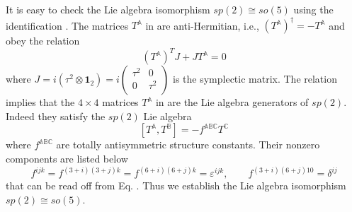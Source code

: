 \documentclass[12pt,epsf]{article}
\begin{document}
It is easy to check the Lie algebra isomorphism $sp(2) \cong so(5)$ using the identification .
The matrices $T^\mathbb{A}$ in  are anti-Hermitian, i.e.,
$(T^\mathbb{A})^\dagger = - T^\mathbb{A}$ and obey the relation
\begin{equation}\label{sp2-cond}
 (T^\mathbb{A})^T J + J T^\mathbb{A} = 0
\end{equation}
where $J = i (\tau^2 \otimes \mathbf{1}_2) = i \left(
                                   \begin{array}{cc}
                                     \tau^2 & 0 \\
                                     0 & \tau^2 \\
                                   \end{array}
                                 \right)$ is the symplectic matrix.
The relation  implies that the $4 \times 4$ matrices $T^\mathbb{A}$ in  are the Lie algebra generators
of $sp(2)$. Indeed they satisfy the $sp(2)$ Lie algebra
\begin{equation}\label{sp2-lie}
  [T^\mathbb{A}, T^\mathbb{B}] = -f^{\mathbb{A} \mathbb{B} \mathbb{C}} T^\mathbb{C}
\end{equation}
where $f^{\mathbb{A}\mathbb{B}\mathbb{C}}$ are totally antisymmetric structure constants.
Their nonzero components are listed below
\begin{equation}\label{sp2-str-const}
  f^{ijk} = f^{(3+i)(3+j) k} = f^{(6+i)(6+j) k} = \varepsilon^{ijk}, \qquad f^{(3+i)(6+j) 10} = \delta^{ij}
\end{equation}
that can be read off from Eq. .
Thus we establish the Lie algebra isomorphism $sp(2) \cong so(5)$.
\end{document}
